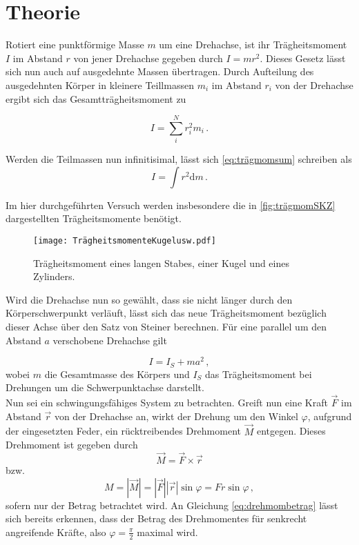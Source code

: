 \section{Theorie}
\label{sec:Theorie}
Rotiert eine punktförmige Masse $m$ um eine Drehachse, ist ihr Trägheitsmoment $I$ im Abstand $r$ von jener Drehachse gegeben durch $I = m r^2$.
Dieses Gesetz lässt sich nun auch auf ausgedehnte Massen übertragen. Durch Aufteilung des ausgedehnten Körper in kleinere Teillmassen $m_i$ im Abstand $r_i$ von der Drehachse ergibt sich
das Gesamtträgheitsmoment zu

\begin{equation}
    I = \sum_i^N r^2_i m_i\,.
    \label{eq:trägmomsum}
\end{equation}

Werden die Teilmassen nun infinitisimal, lässt sich \eqref{eq:trägmomsum} schreiben als
\begin{equation}
    I = \int r^2 \mathrm{d}m\,.
    \label{eq:trägmomint}
\end{equation}

Im hier durchgeführten Versuch werden insbesondere die in \autoref{fig:trägmomSKZ} dargestellten Trägheitsmomente benötigt.

\begin{figure}
    \centering
    \texttt{[image: TrägheitsmomenteKugelusw.pdf]}
    \caption{Trägheitsmoment eines langen Stabes, einer Kugel und eines Zylinders\cite{ap05}.}
    \label{fig:trägmomSKZ}
\end{figure}

Wird die Drehachse nun so gewählt, dass sie nicht länger durch den Körperschwerpunkt verläuft, lässt sich das neue Trägheitsmoment bezüglich dieser Achse über den Satz von Steiner berechnen.
Für eine parallel um den Abstand $a$ verschobene Drehachse gilt

\begin{equation}
    I = I_S + ma^2\,,
    \label{eq:steiner}
\end{equation}
wobei $m$ die Gesamtmasse des Körpers und $I_S$ das Trägheitsmoment bei Drehungen um die Schwerpunktachse darstellt. \\

Nun sei ein schwingungsfähiges System zu betrachten. Greift nun eine Kraft $\vec{F}$ im Abstand $\vec{r}$ von der Drehachse an, wirkt der Drehung um den Winkel $\varphi$, aufgrund der eingesetzten Feder,
ein rücktreibendes Drehmoment $\vec{M}$ entgegen. 
Dieses Drehmoment ist gegeben durch
\begin{equation*}
    \vec{M} = \vec{F} \times \vec{r}
\end{equation*}
bzw.
\begin{equation}
    M = |\vec{M}| = |\vec{F}||\vec{r}| \sin\varphi = F r \sin\varphi\,,
    \label{eq:drehmombetrag}
\end{equation}
sofern nur der Betrag betrachtet wird.
An Gleichung \eqref{eq:drehmombetrag} lässt sich bereits erkennen, dass der Betrag des Drehmomentes für senkrecht angreifende Kräfte, also $\varphi=\frac{π}{2}$ maximal wird. \\

